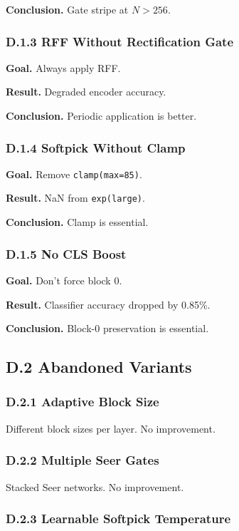 \textbf{Conclusion.} Gate stripe at $N > 256$.

\subsubsection{D.1.3 RFF Without Rectification Gate}

\textbf{Goal.} Always apply RFF.

\textbf{Result.} Degraded encoder accuracy.

\textbf{Conclusion.} Periodic application is better.

\subsubsection{D.1.4 Softpick Without Clamp}

\textbf{Goal.} Remove \texttt{clamp(max=85)}.

\textbf{Result.} NaN from \texttt{exp(large)}.

\textbf{Conclusion.} Clamp is essential.

\subsubsection{D.1.5 No CLS Boost}

\textbf{Goal.} Don't force block 0.

\textbf{Result.} Classifier accuracy dropped by 0.85\%.

\textbf{Conclusion.} Block-0 preservation is essential.

\subsection{D.2 Abandoned Variants}

\subsubsection{D.2.1 Adaptive Block Size}

Different block sizes per layer. No improvement.

\subsubsection{D.2.2 Multiple Seer Gates}

Stacked Seer networks. No improvement.

\subsubsection{D.2.3 Learnable Softpick Temperature}

